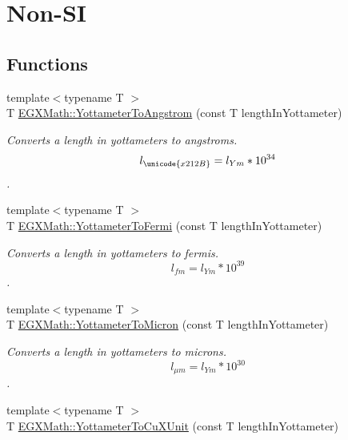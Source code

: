 \hypertarget{group___e_g_x_math-_conversions-_length_conversions-_s_i-_yottameter-_non-_s_i}{}\section{Non-\/\+SI}
\label{group___e_g_x_math-_conversions-_length_conversions-_s_i-_yottameter-_non-_s_i}
\subsection*{Functions}
\begin{DoxyCompactItemize}
\item 
{\footnotesize template$<$typename T $>$ }\\T \mbox{\hyperlink{group___e_g_x_math-_conversions-_length_conversions-_s_i-_yottameter-_non-_s_i_ga0129b788ceb2d7d4ce86c155ee9d4675}{E\+G\+X\+Math\+::\+Yottameter\+To\+Angstrom}} (const T length\+In\+Yottameter)
\begin{DoxyCompactList}\small\item\em Converts a length in yottameters to angstroms. \[ l_{\unicode{x212B}}=l_{Ym} * 10^{34} \]. \end{DoxyCompactList}\item 
{\footnotesize template$<$typename T $>$ }\\T \mbox{\hyperlink{group___e_g_x_math-_conversions-_length_conversions-_s_i-_yottameter-_non-_s_i_gabf900c05975691fab8c5df7de16a467c}{E\+G\+X\+Math\+::\+Yottameter\+To\+Fermi}} (const T length\+In\+Yottameter)
\begin{DoxyCompactList}\small\item\em Converts a length in yottameters to fermis. \[ l_{fm}=l_{Ym} * 10^{39} \]. \end{DoxyCompactList}\item 
{\footnotesize template$<$typename T $>$ }\\T \mbox{\hyperlink{group___e_g_x_math-_conversions-_length_conversions-_s_i-_yottameter-_non-_s_i_gaad96d515763b1dfbcd968020e1b97de4}{E\+G\+X\+Math\+::\+Yottameter\+To\+Micron}} (const T length\+In\+Yottameter)
\begin{DoxyCompactList}\small\item\em Converts a length in yottameters to microns. \[ l_{\mu m}=l_{Ym} * 10^{30} \]. \end{DoxyCompactList}\item 
{\footnotesize template$<$typename T $>$ }\\T \mbox{\hyperlink{group___e_g_x_math-_conversions-_length_conversions-_s_i-_yottameter-_non-_s_i_ga5c8a9868ad238225dbf8ebdbfad13930}{E\+G\+X\+Math\+::\+Yottameter\+To\+Cu\+X\+Unit}} (const T length\+In\+Yottameter)

\end{DoxyCompactItemize}
